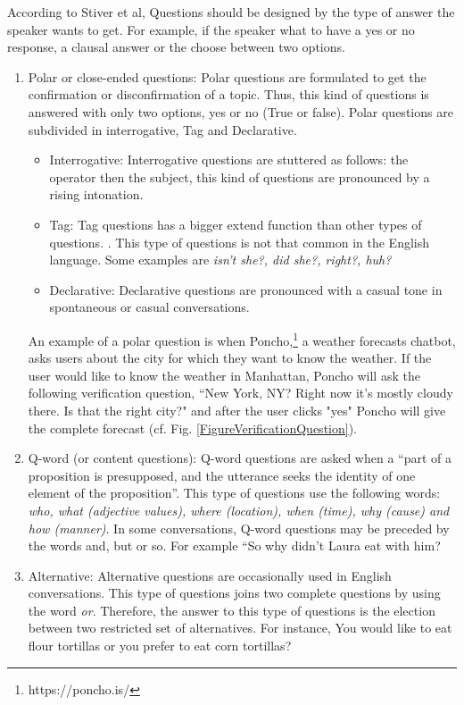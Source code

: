 \documentclass[a4paper,10pt]{article}
\begin{document}
According to Stiver et al,\cite{stivers2010overview} Questions should be designed by the type of answer the speaker wants to get. For example, if the speaker what to have a yes or no response, a clausal answer or the choose between two options.
\begin{enumerate}
\item Polar or close-ended questions: Polar questions are formulated to get the confirmation or disconfirmation of a topic. Thus, this kind of questions is answered with only two options, yes or no (True or false). Polar questions are subdivided in interrogative, Tag and Declarative. 
\begin{itemize}
\item Interrogative: Interrogative questions are stuttered as follows: the operator then the subject, this kind of questions are pronounced by a rising intonation.
\item Tag: Tag questions has a bigger extend function than other types of questions. \cite{quirk2010comprehensive}. This type of questions is not that common in the English language. Some examples are \textit{isn’t she?, did she?, right?, huh?} 
\item Declarative: Declarative questions are pronounced with a casual tone in spontaneous or casual conversations.
\end{itemize}
An example of a polar question is when Poncho,\footnote{https://poncho.is/} a weather forecasts chatbot, asks users about the city for which they want to know the weather. If the user would like to know the weather in Manhattan, Poncho will ask the following verification question, ``New York, NY? Right now it's mostly cloudy there. Is that the right city?" and after the user clicks "yes" Poncho will give the complete forecast (cf. Fig. \ref{FigureVerificationQuestion}). 
\item Q-word (or content questions): Q-word questions are asked when a “part of a proposition is presupposed, and the utterance seeks the identity of one element of the proposition”\cite{stivers2010coding}. This type of questions use the following words: \textit{who, what (adjective values), where (location), when (time), why (cause) and how (manner)}. In some conversations, Q-word questions may be preceded by the words and, but or so. For example “So why didn’t Laura eat with him? 
\item Alternative: Alternative questions are occasionally used in English conversations. This type of questions joins two complete questions by using the word \textit{or}. Therefore, the answer to this type of questions is the election between two restricted set of alternatives. For instance, You would like to eat flour tortillas or you prefer to eat corn tortillas?
\end{enumerate}
\end{document}
